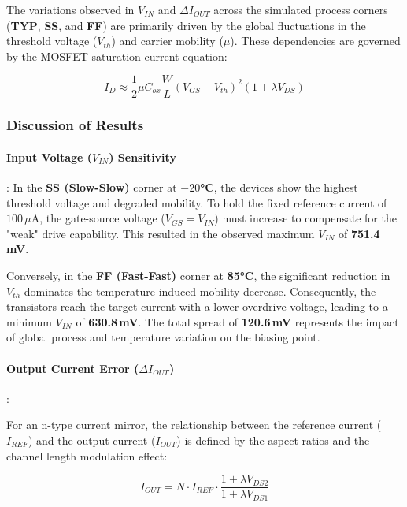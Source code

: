 The variations observed in $V_{IN}$ and $\Delta I_{OUT}$ across the simulated process corners (\textbf{TYP}, \textbf{SS}, and \textbf{FF}) are primarily driven by the global fluctuations in the threshold voltage ($V_{th}$) and carrier mobility ($\mu$). These dependencies are governed by the MOSFET saturation current equation:

\begin{equation*}
I_D \approx \frac{1}{2} \mu C_{ox} \frac{W}{L} (V_{GS} - V_{th})^2 (1 + \lambda V_{DS})
\end{equation*}
\subsubsection{Discussion of Results}
\paragraph{Input Voltage ($V_{IN}$) Sensitivity}:
In the \textbf{SS (Slow-Slow)} corner at \textbf{$-20$°C}, the devices show the highest threshold voltage and degraded mobility. To hold the fixed reference current of $100\,\mu$A, the gate-source voltage ($V_{GS} = V_{IN}$) must increase to compensate for the "weak" drive capability. This resulted in the observed maximum $V_{IN}$ of \textbf{751.4\,mV}. 

Conversely, in the \textbf{FF (Fast-Fast)} corner at \textbf{85°C}, the significant reduction in $V_{th}$ dominates the temperature-induced mobility decrease. Consequently, the transistors reach the target current with a lower overdrive voltage, leading to a minimum $V_{IN}$ of \textbf{630.8\,mV}. The total spread of \textbf{120.6\,mV} represents the impact of global process and temperature variation on the biasing point.



\paragraph{Output Current Error ($\Delta I_{OUT}$)}:

For an n-type current mirror, the relationship between the reference current ($I_{REF}$) and the output current ($I_{OUT}$) is defined by the aspect ratios and the channel length modulation effect:

\begin{equation*}
I_{OUT} = N \cdot I_{REF} \cdot \frac{1 + \lambda V_{DS2}}{1 + \lambda V_{DS1}}
\end{equation*}

